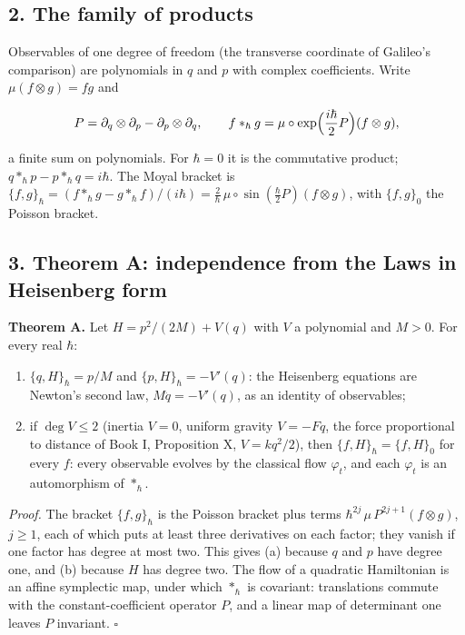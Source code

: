 \documentclass[11pt,a4paper]{article}
\begin{document}
\hypertarget{the-family-of-products}{%
\subsection{2. The family of products}\label{the-family-of-products}}

Observables of one degree of freedom (the transverse coordinate of
Galileo's comparison) are polynomials in \(q\) and \(p\) with complex
coefficients. Write \(\mu(f\otimes g)=fg\) and

\[P=\partial_q\otimes\partial_p-\partial_p\otimes\partial_q,\qquad
f*_\hbar g=\mu\circ\exp\Bigl(\frac{i\hbar}2P\Bigr)(f\otimes g),\]

a finite sum on polynomials. For \(\hbar=0\) it is the commutative
product; \(q*_\hbar p-p*_\hbar q=i\hbar\). The Moyal bracket is
\(\{f,g\}_\hbar=(f*_\hbar g-g*_\hbar f)/(i\hbar)=\frac2\hbar\, \mu\circ\sin(\frac\hbar2P)(f\otimes g)\),
with \(\{f,g\}_0\) the Poisson bracket.

\hypertarget{theorem-a-independence-from-the-laws-in-heisenberg-form}{%
\subsection{3. Theorem A: independence from the Laws in Heisenberg
form}\label{theorem-a-independence-from-the-laws-in-heisenberg-form}}

\textbf{Theorem A.} Let \(H=p^2/(2M)+V(q)\) with \(V\) a polynomial and
\(M>0\). For every real \(\hbar\):

\begin{enumerate}
\def\labelenumi{(\alph{enumi})}
\item
  \(\{q,H\}_\hbar=p/M\) and \(\{p,H\}_\hbar=-V'(q)\): the Heisenberg
  equations are Newton's second law, \(M\ddot q=-V'(q)\), as an identity
  of observables;
\item
  if \(\deg V\le2\) (inertia \(V=0\), uniform gravity \(V=-Fq\), the
  force proportional to distance of Book I, Proposition X,
  \(V=kq^2/2\)), then \(\{f,H\}_\hbar=\{f,H\}_0\) for every \(f\): every
  observable evolves by the classical flow \(\varphi_t\), and each
  \(\varphi_t\) is an automorphism of \(*_\hbar\).
\end{enumerate}

\emph{Proof.} The bracket \(\{f,g\}_\hbar\) is the Poisson bracket plus
terms \(\hbar^{2j}\,\mu\,P^{2j+1}(f\otimes g)\), \(j\ge1\), each of
which puts at least three derivatives on each factor; they vanish if one
factor has degree at most two. This gives (a) because \(q\) and \(p\)
have degree one, and (b) because \(H\) has degree two. The flow of a
quadratic Hamiltonian is an affine symplectic map, under which
\(*_\hbar\) is covariant: translations commute with the
constant-coefficient operator \(P\), and a linear map of determinant one
leaves \(P\) invariant. \(\square\)
\end{document}
